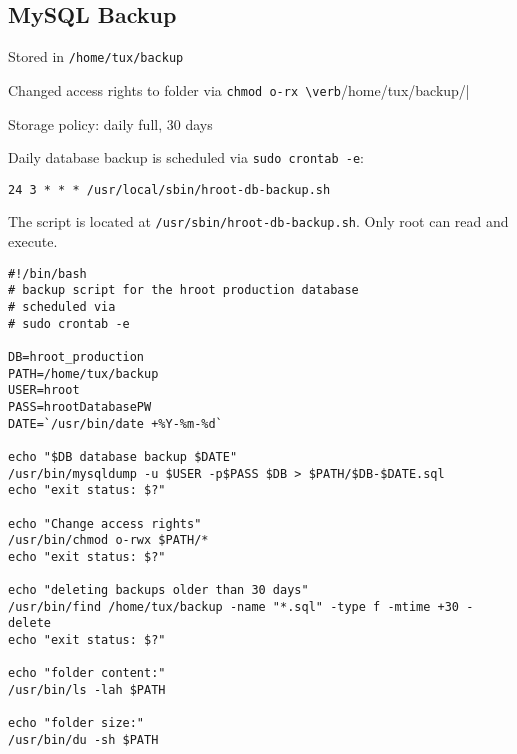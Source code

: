 \documentclass{article}
\begin{document}
\subsection{MySQL Backup}
Stored in \verb|/home/tux/backup|

Changed access rights to folder via \verb|chmod o-rx \verb|/home/tux/backup/|

Storage policy: daily full, 30 days

Daily database backup is scheduled via \verb|sudo crontab -e|:
\begin{lstlisting}   
24 3 * * * /usr/local/sbin/hroot-db-backup.sh 
\end{lstlisting}

The script is located at \verb|/usr/sbin/hroot-db-backup.sh|. Only root can read and execute.
\begin{lstlisting}
#!/bin/bash
# backup script for the hroot production database
# scheduled via
# sudo crontab -e

DB=hroot_production
PATH=/home/tux/backup
USER=hroot
PASS=hrootDatabasePW
DATE=`/usr/bin/date +%Y-%m-%d`

echo "$DB database backup $DATE" 
/usr/bin/mysqldump -u $USER -p$PASS $DB > $PATH/$DB-$DATE.sql
echo "exit status: $?" 

echo "Change access rights"
/usr/bin/chmod o-rwx $PATH/*
echo "exit status: $?"

echo "deleting backups older than 30 days"
/usr/bin/find /home/tux/backup -name "*.sql" -type f -mtime +30 -delete
echo "exit status: $?" 

echo "folder content:"
/usr/bin/ls -lah $PATH

echo "folder size:"
/usr/bin/du -sh $PATH
\end{lstlisting}
\end{document}
